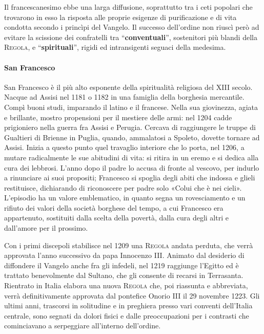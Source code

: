 \documentclass[a4paper, twoside, titlepage]{book}
\newcommand{\titolo}[1]{\textsc{#1}} %
\begin{document}
Il francescanesimo ebbe una larga diffusione, soprattutto tra i ceti popolari che trovarono in esso la risposta alle proprie esigenze di purificazione e di vita condotta secondo i princìpi del Vangelo. Il successo dell'ordine non riuscì però ad evitare la scissione dei confratelli tra ``\textbf{conventuali}'', sostenitori più blandi della \titolo{Regola}, e ``\textbf{spirituali}'', rigidi ed intransigenti seguaci della medesima.

\paragraph{San Francesco} San Francesco è il più alto esponente della spiritualità religiosa del XIII secolo. Nacque ad Assisi nel 1181 o 1182 in una famiglia della borghesia mercantile. Compì buoni studi, imparando il latino e il francese. Nella sua giovinezza, agiata e brillante, mostro propensioni per il mestiere delle armi: nel 1204 cadde prigioniero nella guerra fra Assisi e Perugia. Cercava di raggiungere le truppe di Gualtieri di Brienne in Puglia, quando, ammalatosi a Spoleto, dovette tornare ad Assisi. Inizia a questo punto quel travaglio interiore che lo porta, nel 1206, a mutare radicalmente le sue abitudini di vita: si ritira in un eremo e si dedica alla cura dei lebbrosi. L'anno dopo il padre lo accusa di fronte al vescovo, per indurlo a rinunciare ai suoi propositi; Francesco si spoglia degli abiti che indossa e glieli restituisce, dichiarando di riconoscere per padre solo «Colui che è nei cieli». L'episodio ha un valore emblematico, in quanto segna un rovesciamento e un rifiuto dei valori della società borghese del tempo, a cui Francesco era appartenuto, sostituiti dalla scelta della povertà, dalla cura degli altri e dall'amore per il prossimo.

Con i primi discepoli stabilisce nel 1209 una \titolo{Regola} andata perduta, che verrà approvata l'anno successivo da papa Innocenzo III. Animato dal desiderio di diffondere il Vangelo anche fra gli infedeli, nel 1219 raggiunge l'Egitto ed è trattato benevolmente dal Sultano, che gli consente di recarsi in Terrasanta. Rientrato in Italia elabora una nuova \titolo{Regola} che, poi riassunta e abbreviata, verrà definitivamente approvata dal pontefice Onorio III il 29 novembre 1223. Gli ultimi anni, trascorsi in solitudine e in preghiera presso vari conventi dell'Italia centrale, sono segnati da dolori fisici e dalle preoccupazioni per i contrasti che cominciavano a serpeggiare all'interno dell'ordine.
\end{document}

